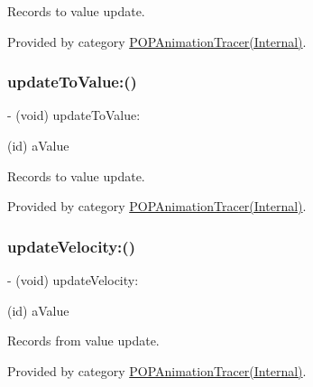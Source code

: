 Records to value update. 

Provided by category \mbox{\hyperlink{category_p_o_p_animation_tracer_07_internal_08_a00d4c0e1b6b446081cfb6c153f37a633}{P\+O\+P\+Animation\+Tracer(\+Internal)}}.

\mbox{\label{interface_p_o_p_animation_tracer_a00d4c0e1b6b446081cfb6c153f37a633}} 
\subsubsection{\texorpdfstring{update\+To\+Value\+:()}{updateToValue:()}\hspace{0.1cm}{\footnotesize\ttfamily [2/2]}}
{\footnotesize\ttfamily -\/ (void) update\+To\+Value\+: \begin{DoxyParamCaption}\item[{(id)}]{a\+Value }\end{DoxyParamCaption}}

Records to value update. 

Provided by category \mbox{\hyperlink{category_p_o_p_animation_tracer_07_internal_08_a00d4c0e1b6b446081cfb6c153f37a633}{P\+O\+P\+Animation\+Tracer(\+Internal)}}.

\mbox{\label{interface_p_o_p_animation_tracer_ab828c06696377e94ba3bdd490b5cd146}} 
\subsubsection{\texorpdfstring{update\+Velocity\+:()}{updateVelocity:()}\hspace{0.1cm}{\footnotesize\ttfamily [1/2]}}
{\footnotesize\ttfamily -\/ (void) update\+Velocity\+: \begin{DoxyParamCaption}\item[{(id)}]{a\+Value }\end{DoxyParamCaption}}

Records from value update. 

Provided by category \mbox{\hyperlink{category_p_o_p_animation_tracer_07_internal_08_ab828c06696377e94ba3bdd490b5cd146}{P\+O\+P\+Animation\+Tracer(\+Internal)}}.

